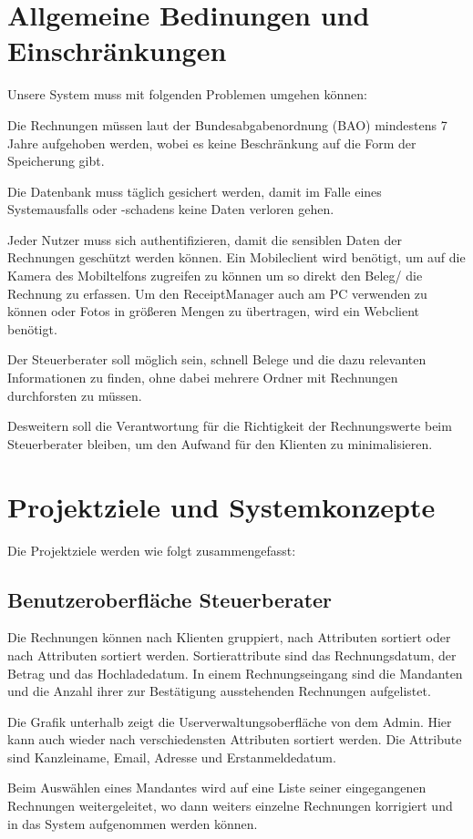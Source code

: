 \documentclass[12pt]{article}
\theoremstyle{definition}
\newcommand*{\skippingparagraph}{\par\vspace{\baselineskip}\noindent}
\begin{document}
\section{Allgemeine Bedinungen und Einschränkungen}
Unsere System muss mit folgenden Problemen umgehen können: 
\skippingparagraph
Die Rechnungen müssen laut der Bundesabgabenordnung (BAO) mindestens 7 Jahre aufgehoben werden, wobei es keine Beschränkung auf die Form der Speicherung gibt.
\skippingparagraph
Die Datenbank muss täglich gesichert werden, damit im Falle eines Systemausfalls oder -schadens keine Daten verloren gehen.
\skippingparagraph
Jeder Nutzer muss sich authentifizieren, damit die sensiblen Daten der Rechnungen geschützt werden können.
Ein Mobileclient wird benötigt, um auf die Kamera des Mobiltelfons zugreifen zu können um so direkt den Beleg/ die Rechnung zu erfassen. Um den ReceiptManager auch am PC verwenden zu können oder Fotos in größeren Mengen zu übertragen, wird ein Webclient benötigt.
\skippingparagraph
Der Steuerberater soll möglich sein, schnell Belege und die dazu relevanten Informationen zu finden, ohne dabei mehrere Ordner mit Rechnungen durchforsten zu müssen.
\skippingparagraph
Desweitern soll die Verantwortung für die Richtigkeit der Rechnungswerte beim Steuerberater bleiben, um den Aufwand für den Klienten zu minimalisieren.
\par
\pagebreak

\section{Projektziele und Systemkonzepte}
Die Projektziele werden wie folgt zusammengefasst:

\subsection{Benutzeroberfläche Steuerberater}
Die Rechnungen können nach Klienten gruppiert, nach Attributen sortiert oder nach Attributen sortiert werden. Sortierattribute sind das Rechnungsdatum, der Betrag und das Hochladedatum. 
In einem Rechnungseingang sind die Mandanten und die Anzahl ihrer zur Bestätigung ausstehenden Rechnungen aufgelistet. \\
\par
Die Grafik unterhalb zeigt die Userverwaltungsoberfläche von dem Admin. Hier kann auch wieder nach verschiedensten Attributen sortiert werden. Die Attribute sind Kanzleiname, Email, Adresse und Erstanmeldedatum.
\par
\noindent Beim Auswählen eines Mandantes wird auf eine Liste seiner eingegangenen Rechnungen weitergeleitet, wo dann weiters einzelne Rechnungen korrigiert und in das System aufgenommen werden können.
\par
\end{document}
